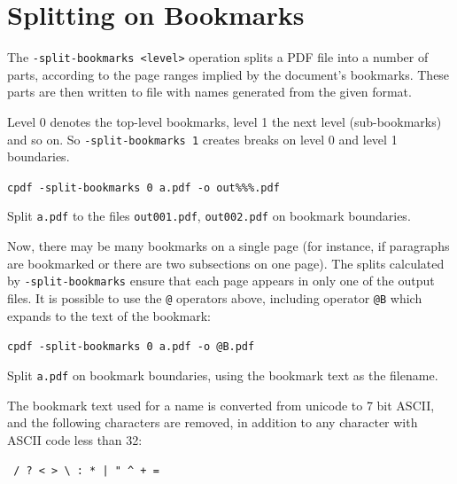 \documentclass[a4paper,makeidx]{memoir}
\begin{document}
  \section{Splitting on Bookmarks}
  The \texttt{-split-bookmarks <level>} operation splits a PDF file into a number of
parts, according to the page ranges implied by the document's bookmarks. These
parts are then written to file with names generated from the given format.
  
Level 0 denotes the top-level bookmarks, level 1 the next level (sub-bookmarks)
and so on. So \texttt{-split-bookmarks 1} creates breaks on level 0 and level
1 boundaries.

  \begin{framed}\small
    \verb!cpdf -split-bookmarks 0 a.pdf -o out%%%.pdf!

    \vspace{2.5mm}
    \noindent Split \texttt{a.pdf} to the files \texttt{out001.pdf},
\texttt{out002.pdf} on bookmark boundaries.

  \end{framed}
\noindent Now, there may be many bookmarks on a single page (for instance, if
paragraphs are bookmarked or there are two subsections on one page). The splits
calculated by \texttt{-split-bookmarks} ensure that each page appears in only
one of the output files.
  It is possible to use the \texttt{@} operators above, including operator \texttt{@B} which expands to the text of the bookmark:

  \begin{framed}\small
    \verb!cpdf -split-bookmarks 0 a.pdf -o @B.pdf!

    \vspace{2.5mm}
    \noindent Split \texttt{a.pdf} on bookmark boundaries, using the bookmark text as the filename.

  \end{framed}
\noindent The bookmark text used for a name is converted from unicode to 7 bit ASCII, and the following characters are removed, in addition to any character with ASCII code less than 32:
  \begin{framed}
  \centering
  \verb! / ? < > \ : * | " ^ + =!
  \end{framed}
\end{document}
